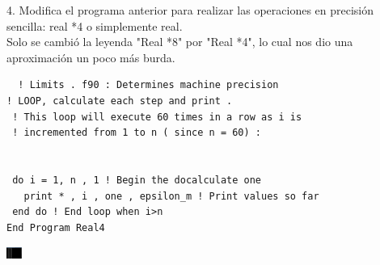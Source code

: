 \documentclass[12pt]{article}
\begin{document}
 4. Modifica el programa anterior para realizar las operaciones en precisión sencilla: real *4 o simplemente real.\\
  Solo se cambió la leyenda "Real *8" por "Real *4", lo cual nos dio una aproximación un poco más burda.\\
  \begin{verbatim}
  ! Limits . f90 : Determines machine precision
! LOOP, calculate each step and print .
 ! This loop will execute 60 times in a row as i is
 ! incremented from 1 to n ( since n = 60) :


 do i = 1, n , 1 ! Begin the docalculate one
   print * , i , one , epsilon_m ! Print values so far
 end do ! End loop when i>n
End Program Real4
 \end{verbatim}
  \begin{center}
\includegraphics[width=0.5cm]{Real4f90.png}\\
 \end{center}
  
\end{document}
